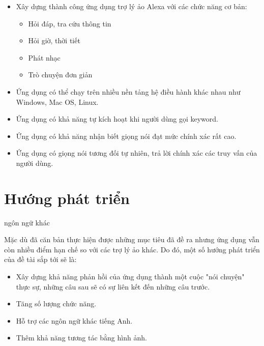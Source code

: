 \begin{itemize}
    \item Xây dựng thành công ứng dụng trợ lý ảo Alexa với các chức năng cơ bản:
    \begin{itemize}
        \item Hỏi đáp, tra cứu thông tin
        \item Hỏi giờ, thời tiết
        \item Phát nhạc
        \item Trò chuyện đơn giản
    \end{itemize}
    \item Ứng dụng có thể chạy trên nhiều nền tảng hệ điều hành khác nhau như Windows, Mac OS, Linux.
    \item Ứng dụng có khả năng tự kích hoạt khi người dùng gọi keyword.
    \item Ứng dụng có khả năng nhận biết giọng nói đạt mức chính xác rất cao.
    \item Ứng dụng có giọng nói tương đối tự nhiên, trả lời chính xác các truy vấn của người dùng.
\end{itemize}

\section{Hướng phát triển}

ngôn ngữ khác

Mặc dù đã căn bản thực hiện được những mục tiêu đã đề ra nhưng ứng dụng vẫn còn nhiều điểm hạn chế so với các trợ lý ảo khác. Do đó, một số hướng phát triển của đề tài sắp tới sẽ là:

\begin{itemize}
    \item Xây dựng khả năng phản hồi của ứng dụng thành một cuộc "nói chuyện" thực sự, những câu sau sẽ có sự liên kết đến những câu trước.
    \item Tăng số lượng chức năng.
    \item Hỗ trợ các ngôn ngữ khác tiếng Anh.
    \item Thêm khả năng tương tác bằng hình ảnh.
\end{itemize}



